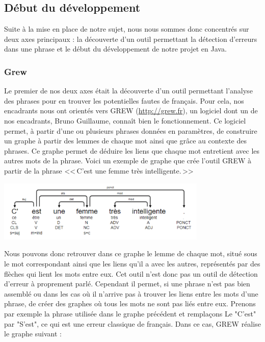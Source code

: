 \documentclass{article}
\begin{document}
\subsection{D\'{e}but du d\'{e}veloppement}
Suite \`{a} la mise en place de notre sujet, nous nous sommes donc concentr\'{e}s sur deux axes principaux : la d\'{e}couverte d'un outil permettant la d\'{e}tection d'erreurs dans une phrase et le d\'{e}but du d\'{e}veloppement de notre projet en Java.

\subsubsection{Grew}
Le premier de nos deux axes \'{e}tait la d\'{e}couverte d'un outil permettant l'analyse des phrases pour en trouver les potentielles fautes de fran\c{c}ais. Pour cela, nos encadrants nous ont orient\'{e}s vers GREW (\url{http://grew.fr}), un logiciel dont un de nos encadrants, Bruno Guillaume, conna\^{i}t bien le fonctionnement. Ce logiciel permet, \`{a} partir d'une ou plusieurs phrases donn\'{e}es en param\`{e}tres, de construire un graphe \`{a} partir des lemmes de chaque mot ainsi que gr\^{a}ce au contexte des phrases. Ce graphe permet de d\'{e}duire les liens que chaque mot entretient avec les autres mots de la phrase. Voici un exemple de graphe que cr\'{e}e l'outil GREW \`{a} partir de la phrase <<\,C'est une femme tr\`{e}s intelligente.\,>>

\begin{center}
\includegraphics[width=10cm]{graphgrew.png} %
\end{center}

Nous pouvons donc retrouver dans ce graphe le lemme de chaque mot, situ\'{e} sous le mot correspondant ainsi que les liens qu'il a avec les autres, repr\'{e}sent\'{e}s par des fl\`{e}ches qui lient les mots entre eux. Cet outil n'est donc pas un outil de d\'{e}tection d'erreur \`{a} proprement parl\'{e}. Cependant il permet, si une phrase n'est pas bien assembl\'{e} ou dans les cas o\`{u} il n'arrive pas \`{a} trouver les liens entre les mots d'une phrase, de cr\'{e}er des graphes o\`{u} tous les mots ne sont pas li\'{e}s entre eux. Prenons par exemple la phrase utilis\'{e}e dans le graphe pr\'{e}c\'{e}dent et rempla\c{c}ons Le "C'est" par "S'est", ce qui est une erreur classique de fran\c{c}ais. Dans ce cas, GREW r\'{e}alise le graphe suivant :
\end{document}
